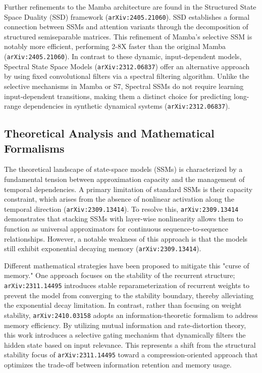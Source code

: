 \documentclass[11pt]{article}
\begin{document}
Further refinements to the Mamba architecture are found in the Structured State Space Duality (SSD) framework (\texttt{arXiv:2405.21060}). SSD establishes a formal connection between SSMs and attention variants through the decomposition of structured semiseparable matrices. This refinement of Mamba’s selective SSM is notably more efficient, performing 2-8X faster than the original Mamba (\texttt{arXiv:2405.21060}). In contrast to these dynamic, input-dependent models, Spectral State Space Models (\texttt{arXiv:2312.06837}) offer an alternative approach by using fixed convolutional filters via a spectral filtering algorithm. Unlike the selective mechanisms in Mamba or S7, Spectral SSMs do not require learning input-dependent transitions, making them a distinct choice for predicting long-range dependencies in synthetic dynamical systems (\texttt{arXiv:2312.06837}).

\subsection{Theoretical Analysis and Mathematical Formalisms}

The theoretical landscape of state-space models (SSMs) is characterized by a fundamental tension between approximation capacity and the management of temporal dependencies. A primary limitation of standard SSMs is their capacity constraint, which arises from the absence of nonlinear activation along the temporal direction (\texttt{arXiv:2309.13414}). To resolve this, \texttt{arXiv:2309.13414} demonstrates that stacking SSMs with layer-wise nonlinearity allows them to function as universal approximators for continuous sequence-to-sequence relationships. However, a notable weakness of this approach is that the models still exhibit exponential decaying memory (\texttt{arXiv:2309.13414}).

Different mathematical strategies have been proposed to mitigate this "curse of memory." One approach focuses on the stability of the recurrent structure; \texttt{arXiv:2311.14495} introduces stable reparameterization of recurrent weights to prevent the model from converging to the stability boundary, thereby alleviating the exponential decay limitation. In contrast, rather than focusing on weight stability, \texttt{arXiv:2410.03158} adopts an information-theoretic formalism to address memory efficiency. By utilizing mutual information and rate-distortion theory, this work introduces a selective gating mechanism that dynamically filters the hidden state based on input relevance. This represents a shift from the structural stability focus of \texttt{arXiv:2311.14495} toward a compression-oriented approach that optimizes the trade-off between information retention and memory usage.
\end{document}
